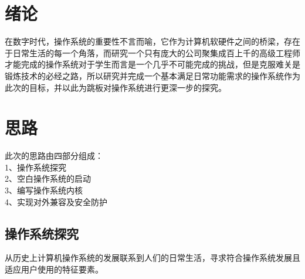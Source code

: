 \documentclass{swfcthesis}
\begin{document}

\makepreliminarypages%
\frontmatter          
\tableofcontents     %
\listoffigures       %
\listoftables        %
\mainmatter

\chapter{绪论}
在数字时代，操作系统的重要性不言而喻，它作为计算机软硬件之间的桥梁，存在于日常生活的每一个角落，而研究一个只有庞大的公司聚集成百上千的高级工程师才能完成的操作系统对于学生而言是一个几乎不可能完成的挑战，但是克服难关是锻炼技术的必经之路\cite{30_os}，所以研究并完成一个基本满足日常功能需求的操作系统作为此次的目标，并以此为跳板对操作系统进行更深一步的探究。

\chapter{思路}

	此次的思路由四部分组成：\\
	\hspace*{1cm}1、操作系统探究 \\
	\hspace*{1cm}2、空白操作系统的启动 \\
	\hspace*{1cm}3、编写操作系统内核 \\
	\hspace*{1cm}4、实现对外兼容及安全防护
	
	\section{操作系统探究}
	从历史上计算机操作系统的发展联系到人们的日常生活，寻求符合操作系统发展且适应用户使用的特征要素。
	
\end{document}
